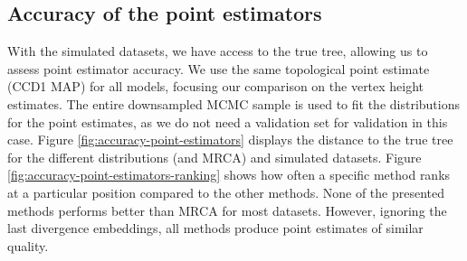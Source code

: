 \documentclass[10pt,letterpaper]{article}
\begin{document}
\subsection*{Accuracy of the point estimators}

With the simulated datasets, we have access to the true tree, allowing us to assess point estimator accuracy. We use the same topological point estimate (CCD1 MAP) for all models, focusing our comparison on the vertex height estimates. The entire downsampled MCMC sample is used to fit the distributions for the point estimates, as we do not need a validation set for validation in this case. Figure \ref{fig:accuracy-point-estimators} displays the distance to the true tree for the different distributions (and MRCA) and simulated datasets. Figure \ref{fig:accuracy-point-estimators-ranking} shows how often a specific method ranks at a particular position compared to the other methods. None of the presented methods performs better than MRCA for most datasets. However, ignoring the last divergence embeddings, all methods produce point estimates of similar quality.
\end{document}

